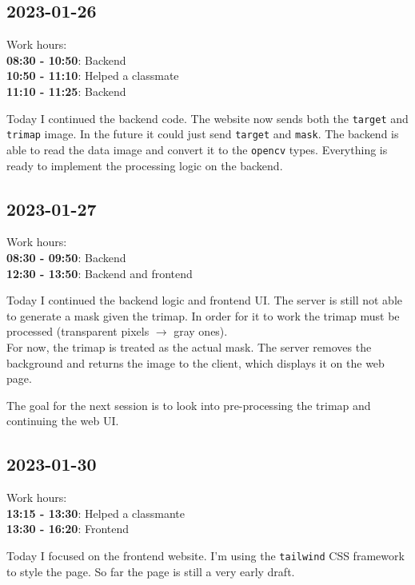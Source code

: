 \documentclass{article}
\begin{document}
\subsection{2023-01-26}

Work hours:\\
\textbf{08:30 - 10:50}: Backend \\
\textbf{10:50 - 11:10}: Helped a classmate \\
\textbf{11:10 - 11:25}: Backend

Today I continued the backend code. The website now sends both the \texttt{target}
and \texttt{trimap} image. In the future it could just send \texttt{target} and \texttt{mask}.
The backend is able to read the data image and convert it to the \texttt{opencv} types.
Everything is ready to implement the processing logic on the backend.

\subsection{2023-01-27}

Work hours:\\
\textbf{08:30 - 09:50}: Backend \\
\textbf{12:30 - 13:50}: Backend and frontend

Today I continued the backend logic and frontend UI.
The server is still not able to generate a mask given the trimap.
In order for it to work the trimap must be processed (transparent pixels \(\rightarrow\) gray ones). \\
For now, the trimap is treated as the actual mask. The server removes the background and returns
the image to the client, which displays it on the web page.

The goal for the next session is to look into pre-processing the trimap
and continuing the web UI.

\pagebreak

\subsection{2023-01-30}

Work hours:\\
\textbf{13:15 - 13:30}: Helped a classmante \\
\textbf{13:30 - 16:20}: Frontend

Today I focused on the frontend website. I'm using the \texttt{tailwind} CSS framework
to style the page. So far the page is still a very early draft.
\end{document}
